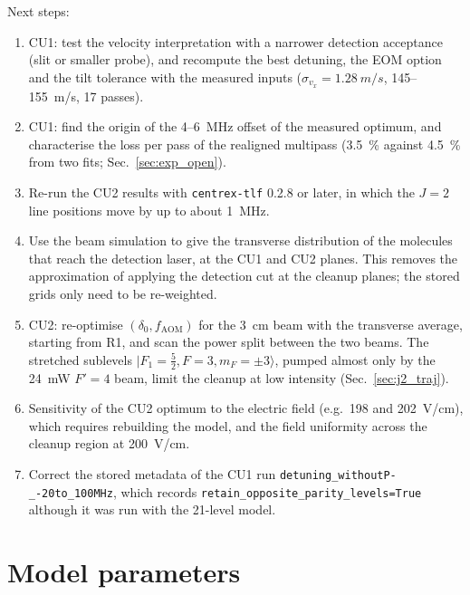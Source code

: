 \documentclass[11pt,a4paper,oneside]{report}
\newcommand{\code}[1]{\texttt{#1}}
\newcommand{\fAOM}{f_{\mathrm{AOM}}}
\begin{document}
Next steps:
\begin{enumerate}[itemsep=0pt,topsep=2pt]
  \item CU1: test the velocity interpretation with a narrower detection acceptance (slit or smaller
        probe), and recompute the best detuning, the EOM option and the tilt tolerance with the measured
        inputs ($\sigma_{v_x}=\SI{1.28}{m/s}$, 145--\SI{155}{m/s}, 17 passes).
  \item CU1: find the origin of the 4--\SI{6}{MHz} offset of the measured optimum, and characterise the
        loss per pass of the realigned multipass (\SI{3.5}{\percent} against \SI{4.5}{\percent} from two
        fits; Sec.~\ref{sec:exp_open}).
  \item Re-run the CU2 results with \code{centrex-tlf} 0.2.8 or later, in which the $J=2$ line positions
        move by up to about \SI{1}{MHz}.
  \item Use the beam simulation to give the transverse distribution of the molecules that reach
        the detection laser, at the CU1 and CU2 planes. This removes the approximation of
        applying the detection cut at the cleanup planes; the stored grids only need to be
        re-weighted.
  \item CU2: re-optimise $(\delta_0,\fAOM)$ for the \SI{3}{cm} beam with the transverse average,
        starting from R1, and scan the power split between the two beams. The stretched
        sublevels $|F_1=\tfrac52,F=3,m_F=\pm3\rangle$, pumped almost only by the \SI{24}{mW}
        $F'=4$ beam, limit the cleanup at low intensity (Sec.~\ref{sec:j2_traj}).
  \item Sensitivity of the CU2 optimum to the electric field (e.g.\ 198 and \SI{202}{V/cm}), which
        requires rebuilding the model, and the field uniformity across the cleanup region at
        \SI{200}{V/cm}.
  \item Correct the stored metadata of the CU1 run \code{detuning\_withoutP-\_-20to\_100MHz},
        which records \code{retain\_opposite\_parity\_levels=True} although it was run with
        the 21-level model.
\end{enumerate}

\appendix

\chapter{Model parameters}
\label{app:params}
\end{document}
